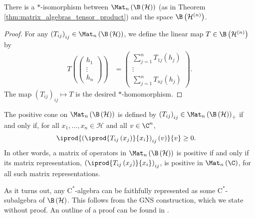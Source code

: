 \begin{theorem}
  There is a $\ast$-isomorphism between $\Mat_n\left( \B\left( \mathcal{H} \right) \right)$ (as in Theorem \ref{thm:matrix_algebras_tensor_product}) and the space $\B\left( \mathcal{H}^{(n)} \right)$.
\end{theorem}
\begin{proof}
  For any $\left( T_{ij} \right)_{ij}\in \Mat_n\left( \B\left( \mathcal{H} \right) \right)$, we define the linear map $T\in \B\left( \mathcal{H}^{(n)} \right)$ by
  \begin{align*}
    T\left( \begin{pmatrix}h_1\\\vdots\\h_n\end{pmatrix} \right) &= \begin{pmatrix}\sum_{j=1}^{n}T_{1j}\left( h_j \right) \\ \vdots \\ \sum_{j=1}^{n}T_{nj}\left( h_j \right)\end{pmatrix}.
  \end{align*}
  The map $\left( T_{ij} \right)_{ij} \mapsto T$ is the desired $\ast$-homomorphism.
\end{proof}
\begin{remark}
  The positive cone on $\Mat_n\left( \B\left( \mathcal{H} \right) \right)$ is defined by $\left( T_{ij} \right)_{ij}\in \Mat_n\left( \B\left( \mathcal{H} \right) \right)_{+}$ if and only if, for all $x_1,\dots,x_n\in \mathcal{H}$ and all $v\in \C^n$,
  \begin{align*}
    \iprod{\left( \iprod{T_{ij}\left( x_j \right)}{x_i} \right)_{ij} \left( v \right)}{v} &\geq 0.
  \end{align*}
  In other words, a matrix of operators in $\Mat_n\left( \B\left( \mathcal{H} \right) \right)$ is positive if and only if its matrix representation, $\left( \iprod{T_{ij}\left( x_j \right)}{x_i} \right)_{ij}$, is positive in $\Mat_n\left( \C \right)$, for all such matrix representations.
\end{remark}
As it turns out, any $\mathrm{C}^{\ast}$-algebra can be faithfully represented as some $\mathrm{C}^{\ast}$-subalgebra of $\B\left( \mathcal{H} \right)$. This follows from the GNS construction, which we state without proof. An outline of a proof can be found in \cite[Section II.6.4]{blackadar_operator_algebras}.
